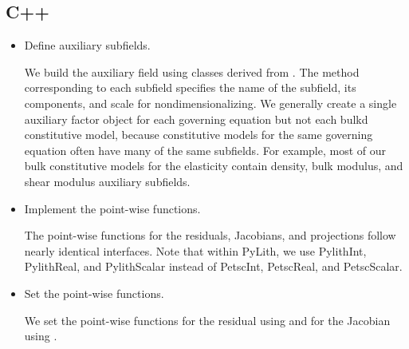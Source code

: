 

\subsection{C++}


\begin{itemize}
\item Define auxiliary subfields.

  We build the auxiliary field using classes derived from
  . The method
  corresponding to each subfield specifies the name of the subfield,
  its components, and scale for nondimensionalizing. We generally
  create a single auxiliary factor object for each governing equation
  but not each bulkd constitutive model, because constitutive models
  for the same governing equation often have many of the same
  subfields. For example, most of our bulk constitutive models for the
  elasticity contain density, bulk modulus, and shear modulus
  auxiliary subfields.


\item Implement the point-wise functions.

  The point-wise functions for the residuals, Jacobians, and
  projections follow nearly identical interfaces. Note that within
  PyLith, we use PylithInt, PylithReal, and PylithScalar instead of
  PetscInt, PetscReal, and PetscScalar.

\item Set the point-wise functions.

  We set the point-wise functions for the residual using
   and for the Jacobian using
  .

\end{itemize}

